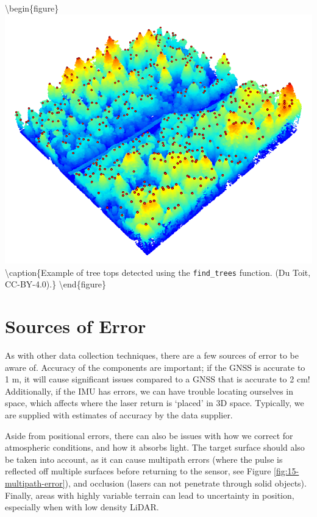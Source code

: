 \documentclass[
]{book}
\begin{document}
\textbackslash begin\{figure\}
\includegraphics[width=0.8\linewidth]{images/15-las-treetops} \textbackslash caption\{Example of tree tops detected using the \texttt{find\_trees} function. (Du Toit, CC-BY-4.0).\}\label{fig:15-las-treetops}
\textbackslash end\{figure\}

\hypertarget{sources-of-error}{%
\section{Sources of Error}\label{sources-of-error}}

As with other data collection techniques, there are a few sources of error to be aware of. Accuracy of the components are important; if the GNSS is accurate to 1 m, it will cause significant issues compared to a GNSS that is accurate to 2 cm! Additionally, if the IMU has errors, we can have trouble locating ourselves in space, which affects where the laser return is `placed' in 3D space. Typically, we are supplied with estimates of accuracy by the data supplier.

Aside from positional errors, there can also be issues with how we correct for atmospheric conditions, and how it absorbs light. The target surface should also be taken into account, as it can cause multipath errors (where the pulse is reflected off multiple surfaces before returning to the sensor, see Figure \ref{fig:15-multipath-error}), and occlusion (lasers can not penetrate through solid objects). Finally, areas with highly variable terrain can lead to uncertainty in position, especially when with low density LiDAR.
\end{document}
